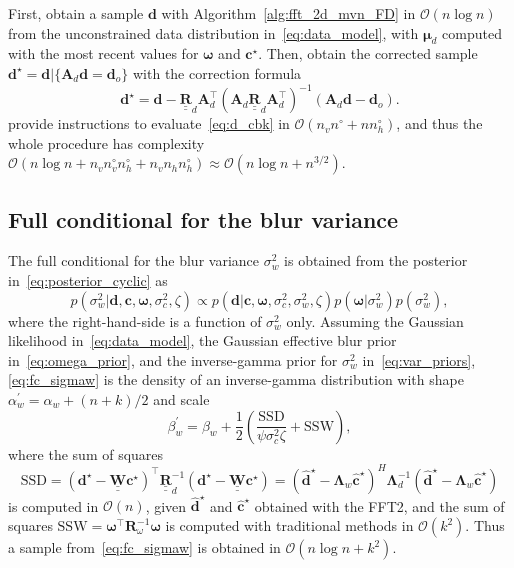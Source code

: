\documentclass[12pt]{article}
\newcommand{\mybcirc}[1] {\underline{\underline{\bm{#1}}}}
\begin{document}
First, obtain a sample $\bm{d}$ with Algorithm~\ref{alg:fft_2d_mvn_FD} in $\mathcal{O}(n \log n)$ from the unconstrained data distribution in~\eqref{eq:data_model}, with $\bm{\mu}_d$ computed with the most recent values for $\bm{\omega}$ and $\bm{c}^{\star}$. Then, obtain the corrected sample $\bm{d}^{\star} = \bm{d} | \{\bm{A}_d \bm{d} = \bm{d}_o \}$ with the correction formula
\begin{equation} \label{eq:d_cbk}
\bm{d}^{\star} = \bm{d} - \mybcirc{R}_d \bm{A}_d^{\top} (\bm{A}_d \mybcirc{R}_d \bm{A}_d^{\top})^{-1}(\bm{A}_d \bm{d} - \bm{d}_{o}).
\end{equation} 
\citet{Senn2025} provide instructions to evaluate~\eqref{eq:d_cbk} in $\mathcal{O}(n_vn^{\circ} + n n_h^{\circ})$, and thus the whole procedure has complexity $\mathcal{O}(n\log n + n_v n_v^\circ n_h^\circ + n_v n_h n_h^{\circ}) \approx \mathcal{O}(n\log n + n^{3/2})$.

\subsection{Full conditional for the blur variance} \label{ap:fc_sigmaw}
The full conditional for the blur variance $\sigma_w^2$ is obtained from the posterior in~\eqref{eq:posterior_cyclic} as
\begin{equation} \label{eq:fc_sigmaw}
    p(\sigma_w^2| \bm{d}, \bm{c}, \bm{\omega}, \sigma_c^2, \zeta) \propto p(\bm{d}| \bm{c}, \bm{\omega}, \sigma_c^2, \sigma_w^2, \zeta) p(\bm{\omega}|\sigma_w^2) p(\sigma_w^2),
\end{equation}
where the right-hand-side is a function of $\sigma_w^2$ only.
Assuming the Gaussian likelihood in~\eqref{eq:data_model}, the Gaussian effective blur prior in~\eqref{eq:omega_prior}, and the inverse-gamma prior for $\sigma_w^2$ in~\eqref{eq:var_priors}, \eqref{eq:fc_sigmaw} is the density of an inverse-gamma distribution with shape $\alpha^{\prime}_w = \alpha_w + (n + k)/2$ and scale
\begin{equation} \label{eq:scale_wavelet_variance} 
    \beta_w^{\prime} = \beta_w + \frac{1}{2} \left (\frac{\mbox{SSD}}{\psi \sigma_c^2 \zeta} + \mbox{SSW}
    \right),
\end{equation}
where the sum of squares
\begin{equation*}
    \mbox{SSD} = (\bm{d}^{\star} - \mybcirc{W} \bm{c}^{\star})^{\top} \mybcirc{R}_d^{-1} (\bm{d}^{\star} - \mybcirc{W} \bm{c}^{\star}) = (\hat{\bm{d}}^{\star} - \bm{\Lambda}_w \hat{\bm{c}}^{\star})^{H} \bm{\Lambda}_d^{-1} (\hat{\bm{d}}^{\star} - \bm{\Lambda}_w \hat{\bm{c}}^{\star})
\end{equation*}
is computed in $\mathcal{O}(n)$, given $\hat{\bm{d}}^{\star}$ and $\hat{\bm{c}}^{\star}$ obtained with the FFT2, and the sum of squares $\mbox{SSW} = \bm{\omega}^{\top} \bm{R}_{\omega}^{-1} \bm{\omega}$ is computed with traditional methods in $\mathcal{O}(k^2)$. Thus a sample from~\eqref{eq:fc_sigmaw} is obtained in $\mathcal{O}(n \log n +  k^2)$. 
\end{document}
